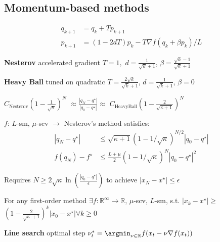 \subsection{Momentum-based methods}
\vspace{-3.5mm}
\[\begin{aligned}
		q_{k+1} & = q_k + Tp_{k+1}                          \\
		p_{k+1} & = (1-2dT)p_k-T\nabla f(q_k + \beta p_k)/L
	\end{aligned}\]
\vspace{-2.7mm}

\textbf{Nesterov}
accelerated gradient
$T = 1,$
$d=\frac{1}{\sqrt{k}+1}$,
$\beta =\frac{\sqrt{k}-1}{\sqrt{k}+1}$

\textbf{Heavy Ball}
tuned on quadratic
$T = \frac{2\sqrt{k}}{\sqrt{k}+1}$,
$d=\frac{1}{\sqrt{k}+1}$,
$\beta=0$


\begin{centering}
	$C_\text{Nesterov}(1-\frac{1}{\sqrt{\kappa}})^N$
	$\approx\frac{|q_N-q^\star|}{|q_0-q^\star|}\approx$
	$C_\text{HeavyBall}(1-\frac{2}{\sqrt{\kappa+1}})^N$
\end{centering}

\begin{theorem}
	$f$: $L$-sm, $\mu$-scv
	$\rightarrow$
	Nesterov's method satisfies:
	\vspace{-1mm}
	\[  \begin{aligned}
			|q_N-q^\star|  & \le
			\sqrt{\kappa+1}(1-1/\sqrt{\kappa})^{N/2}|q_0-q^\star|
			\\
			f(q_N)-f^\star & \le
			\frac{L+\mu}{2}(1-1/\sqrt{\kappa})^{N}|q_0-q^\star|^2
		\end{aligned}\]
\end{theorem}
\vspace{-1mm}

Requires
$N\ge2\sqrt{\kappa}\operatorname{ln}(\frac{|q_{0}-q^\star|}{\epsilon})$
to achieve
$|x_{N}-x^\star|\le\epsilon$

\begin{theorem}
	For any first-order method
	$\exists f: \mathbb{R}^{\infty}\rightarrow\mathbb{R}$,
	$\mu$-scv, $L$-sm,
	s.t.
	$|x_k - x^\star|\ge$
	$(1-\frac{2}{\sqrt{\kappa}+1})^k|x_0 - x^\star| \forall k\ge 0$

\end{theorem}

\textbf{Line search}
optimal step
$\nu_t^*=\argmin_{\nu\in\mathbb{R}}f(x_t-\nu\nabla f(x_t))$
